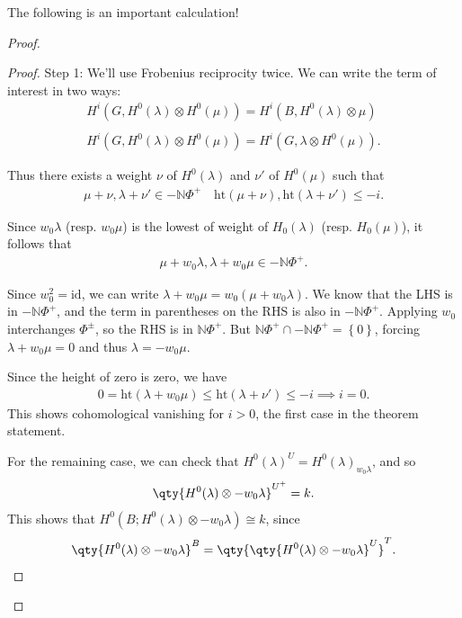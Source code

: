 The following is an important calculation!

\begin{proof}

\begin{proof}

Step 1: We'll use Frobenius reciprocity twice. We can write the term of
interest in two ways:
\begin{align*}   H^i(G, H^0(\lambda) \otimes H^0(\mu)) = H^i(B, H^0(\lambda) \otimes\mu) \\ \\ H^i(G, H^0(\lambda) \otimes H^0(\mu)) = H^i(G, \lambda \otimes H^0(\mu)) .\end{align*}

Thus there exists a weight \(\nu\) of \(H^0(\lambda)\) and \(\nu'\) of
\(H^0(\mu)\) such that
\begin{align*}   \mu + \nu, \lambda + \nu' \in - {\mathbb{N}}\Phi^+ \quad \text{ht}(\mu+\nu), \text{ht}(\lambda + \nu') \leq -i .\end{align*}

Since \(w_0\lambda\) (resp. \(w_0\mu\)) is the lowest of weight of
\(H_0(\lambda)\) (resp. \(H_0(\mu)\)), it follows that
\begin{align*}   \mu + w_0 \lambda, \lambda + w_0\mu \in -{\mathbb{N}}\Phi^+ .\end{align*}

Since \(w_0^2 = \text{id}\), we can write
\(\lambda + w_0\mu = w_0(\mu + w_0 \lambda)\). We know that the LHS is
in \(-{\mathbb{N}}\Phi^+\), and the term in parentheses on the RHS is
also in \(-{\mathbb{N}}\Phi^+\). Applying \(w_0\) interchanges
\(\Phi^\pm\), so the RHS is in \({\mathbb{N}}\Phi^+\). But
\({\mathbb{N}}\Phi^+ \cap-{\mathbb{N}}\Phi^+ = \left\{{0}\right\}\),
forcing \(\lambda + w_0 \mu = 0\) and thus \(\lambda = -w_0 \mu\).

Since the height of zero is zero, we have
\begin{align*}   0 = \text{ht}(\lambda + w_0 \mu) \leq \text{ht}(\lambda + \nu') \leq -i \implies i=0 .\end{align*}
This shows cohomological vanishing for \(i>0\), the first case in the
theorem statement.

For the remaining case, we can check that
\(H^0(\lambda)^{U} = H^0(\lambda)_{w_0 \lambda}\), and so
\begin{align*}   \qty{H^0(\lambda) \otimes-w_0 \lambda}^{U^+} = k .\end{align*}
This shows that \(H^0(B; H^0(\lambda) \otimes-w_0\lambda ) \cong k\),
since
\begin{align*}   \qty{H^0(\lambda) \otimes-w_0 \lambda}^B = \qty{ \qty{H^0(\lambda) \otimes-w_0 \lambda }^U }^T .\end{align*}

\end{proof}

\end{proof}

